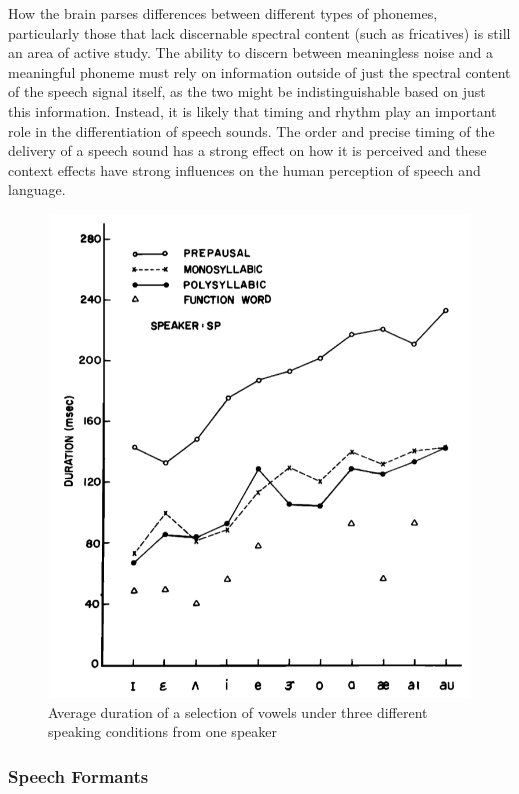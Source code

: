 \documentclass[titlepage]{article}
\begin{document}
    How the brain parses differences between different types of phonemes, particularly
    those that lack discernable spectral content (such as fricatives) is still an area
    of active study. The ability to discern between meaningless noise and a meaningful
    phoneme must rely on information outside of just the spectral content of the
    speech signal itself, as the two might be indistinguishable based on just this information.
    Instead, it is likely that timing and rhythm play an important role in the differentiation
    of speech sounds. The order and precise timing of the delivery of a speech sound has a
    strong effect on how it is perceived and these context effects have strong influences on
    the human perception of speech and language.


    \begin{figure}
      \centering
      \includegraphics[scale=0.3]{vowelDuration}
      \caption{Average duration of a selection of vowels under three different
      speaking conditions from one speaker \cite{Umeda1975}}
      \label{vowelDuration}
    \end{figure}

  \subsubsection{Speech Formants}
\end{document}

